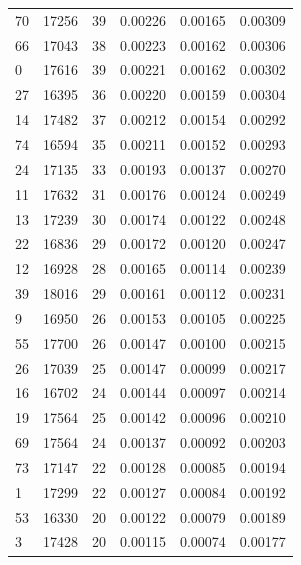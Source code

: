\begin{tabular}{lrrrrr}
70 & 17256 & 39 & 0.00226 & 0.00165 & 0.00309 \\
66 & 17043 & 38 & 0.00223 & 0.00162 & 0.00306 \\
0 & 17616 & 39 & 0.00221 & 0.00162 & 0.00302 \\
27 & 16395 & 36 & 0.00220 & 0.00159 & 0.00304 \\
14 & 17482 & 37 & 0.00212 & 0.00154 & 0.00292 \\
74 & 16594 & 35 & 0.00211 & 0.00152 & 0.00293 \\
24 & 17135 & 33 & 0.00193 & 0.00137 & 0.00270 \\
11 & 17632 & 31 & 0.00176 & 0.00124 & 0.00249 \\
13 & 17239 & 30 & 0.00174 & 0.00122 & 0.00248 \\
22 & 16836 & 29 & 0.00172 & 0.00120 & 0.00247 \\
12 & 16928 & 28 & 0.00165 & 0.00114 & 0.00239 \\
39 & 18016 & 29 & 0.00161 & 0.00112 & 0.00231 \\
9 & 16950 & 26 & 0.00153 & 0.00105 & 0.00225 \\
55 & 17700 & 26 & 0.00147 & 0.00100 & 0.00215 \\
26 & 17039 & 25 & 0.00147 & 0.00099 & 0.00217 \\
16 & 16702 & 24 & 0.00144 & 0.00097 & 0.00214 \\
19 & 17564 & 25 & 0.00142 & 0.00096 & 0.00210 \\
69 & 17564 & 24 & 0.00137 & 0.00092 & 0.00203 \\
73 & 17147 & 22 & 0.00128 & 0.00085 & 0.00194 \\
1 & 17299 & 22 & 0.00127 & 0.00084 & 0.00192 \\
53 & 16330 & 20 & 0.00122 & 0.00079 & 0.00189 \\
3 & 17428 & 20 & 0.00115 & 0.00074 & 0.00177 \\
\bottomrule
\end{tabular}
